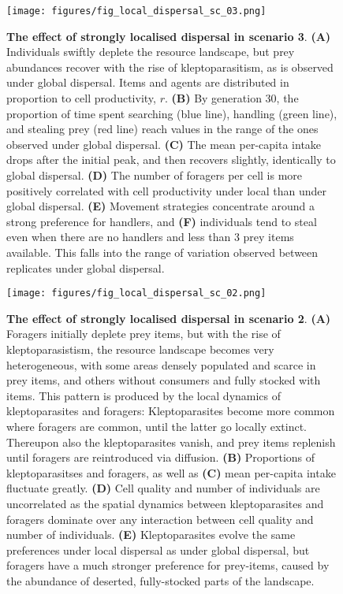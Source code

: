 \documentclass[]{article}
\begin{document}
\begin{figure}
\centering
\texttt{[image: figures/fig\_local\_dispersal\_sc\_03.png]}
\caption{\textbf{The effect of strongly localised dispersal in scenario 3}. \textbf{(A)} Individuals swiftly deplete the resource landscape, but prey abundances recover with the rise of kleptoparasitism, as is observed under global dispersal. Items and agents are distributed in proportion to cell productivity, \(r\). \textbf{(B)} By generation 30, the proportion of time spent searching (blue line), handling (green line), and stealing prey (red line) reach values in the range of the ones observed under global dispersal. \textbf{(C)} The mean per-capita intake drops after the initial peak, and then recovers slightly, identically to global dispersal. \textbf{(D)} The number of foragers per cell is more positively correlated with cell productivity under local than under global dispersal. \textbf{(E)} Movement strategies concentrate around a strong preference for handlers, and \textbf{(F)} individuals tend to steal even when there are no handlers and less than 3 prey items available. This falls into the range of variation observed between replicates under global dispersal.}
\end{figure}

\begin{figure}
\centering
\texttt{[image: figures/fig\_local\_dispersal\_sc\_02.png]}
\caption{\textbf{The effect of strongly localised dispersal in scenario 2}. \textbf{(A)} Foragers initially deplete prey items, but with the rise of kleptoparasistism, the resource landscape becomes very heterogeneous, with some areas densely populated and scarce in prey items, and others without consumers and fully stocked with items. This pattern is produced by the local dynamics of kleptoparasites and foragers: Kleptoparasites become more common where foragers are common, until the latter go locally extinct. Thereupon also the kleptoparasites vanish, and prey items replenish until foragers are reintroduced via diffusion. \textbf{(B)} Proportions of kleptoparasitses and foragers, as well as \textbf{(C)} mean per-capita intake fluctuate greatly. \textbf{(D)} Cell quality and number of individuals are uncorrelated as the spatial dynamics between kleptoparasites and foragers dominate over any interaction between cell quality and number of individuals. \textbf{(E)} Kleptoparasites evolve the same preferences under local dispersal as under global dispersal, but foragers have a much stronger preference for prey-items, caused by the abundance of deserted, fully-stocked parts of the landscape.}
\end{figure}
\end{document}
